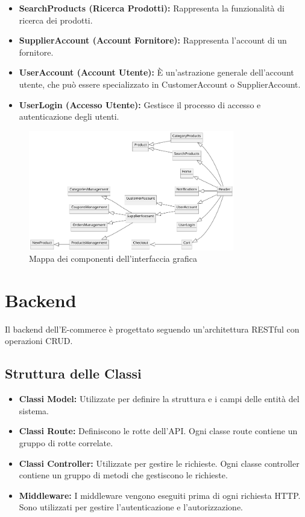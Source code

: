 \begin{itemize}
    \item \textbf{SearchProducts (Ricerca Prodotti):} Rappresenta la funzionalità di ricerca dei prodotti.
    \item \textbf{SupplierAccount (Account Fornitore):} Rappresenta l'account di un fornitore.
    \item \textbf{UserAccount (Account Utente):} È un'astrazione generale dell'account utente, che può essere specializzato in CustomerAccount o SupplierAccount.
    \item \textbf{UserLogin (Accesso Utente):} Gestisce il processo di accesso e autenticazione degli utenti.
\end{itemize}

\begin{figure}
    \centering
    \includegraphics[width=0.8\textwidth]{figures/site-map.png}
    \caption{Mappa dei componenti dell'interfaccia grafica}
    \label{fig:site-map}
\end{figure}

\section{Backend}
Il backend dell'E-commerce è progettato seguendo un'architettura RESTful con operazioni CRUD.

\subsection{Struttura delle Classi}
\begin{itemize}
    \item \textbf{Classi Model:} Utilizzate per definire la struttura e i campi delle entità del sistema.
    \item \textbf{Classi Route:} Definiscono le rotte dell'API. Ogni classe route contiene un gruppo di rotte correlate.
    \item \textbf{Classi Controller:} Utilizzate per gestire le richieste. Ogni classe controller contiene un gruppo di metodi che gestiscono le richieste.
    \item \textbf{Middleware:} I middleware vengono eseguiti prima di ogni richiesta HTTP. Sono utilizzati per gestire l'autenticazione e l'autorizzazione.
\end{itemize}


